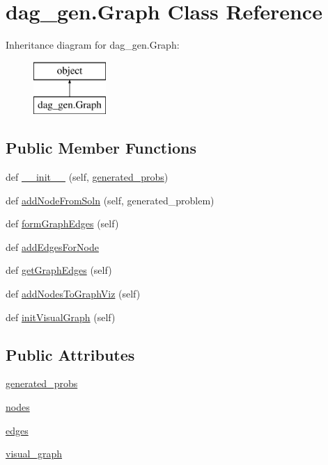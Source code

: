 \hypertarget{classdag__gen_1_1_graph}{}\section{dag\+\_\+gen.\+Graph Class Reference}
\label{classdag__gen_1_1_graph}
Inheritance diagram for dag\+\_\+gen.\+Graph\+:\begin{figure}[H]
\begin{center}
\leavevmode
\includegraphics[height=2.000000cm]{classdag__gen_1_1_graph}
\end{center}
\end{figure}
\subsection*{Public Member Functions}
\begin{DoxyCompactItemize}
\item 
def \hyperlink{classdag__gen_1_1_graph_a68c180ccb57ba7a29ac533fc854c6303}{\+\_\+\+\_\+init\+\_\+\+\_\+} (self, \hyperlink{classdag__gen_1_1_graph_a28d5cae8043efce22f89f11ca36eb303}{generated\+\_\+probs})
\item 
def \hyperlink{classdag__gen_1_1_graph_ad2181fcf4ffc0757162e4542d4f23985}{add\+Node\+From\+Soln} (self, generated\+\_\+problem)
\item 
def \hyperlink{classdag__gen_1_1_graph_a4caaaac0a7b964f20156bff60031a1ba}{form\+Graph\+Edges} (self)
\item 
def \hyperlink{classdag__gen_1_1_graph_a88c9c5f5c690f00d51e5d4799b0a8a1d}{add\+Edges\+For\+Node}
\item 
def \hyperlink{classdag__gen_1_1_graph_a07a3d79f47d449935d22518826adabf7}{get\+Graph\+Edges} (self)
\item 
def \hyperlink{classdag__gen_1_1_graph_a9dcff2a55150dc327da794786ed05ab7}{add\+Nodes\+To\+Graph\+Viz} (self)
\item 
def \hyperlink{classdag__gen_1_1_graph_a92bd4b78b6b9a8049adcac280e924681}{init\+Visual\+Graph} (self)
\end{DoxyCompactItemize}
\subsection*{Public Attributes}
\begin{DoxyCompactItemize}
\item 
\hyperlink{classdag__gen_1_1_graph_a28d5cae8043efce22f89f11ca36eb303}{generated\+\_\+probs}
\item 
\hyperlink{classdag__gen_1_1_graph_a69f6f8ae5e48955976f8ec77a5df2e63}{nodes}
\item 
\hyperlink{classdag__gen_1_1_graph_a9e07ebdf1c1ddec778c7e56a741408a4}{edges}
\item 
\hyperlink{classdag__gen_1_1_graph_a6fa5aa97b32670d1089b5743d702083b}{visual\+\_\+graph}
\end{DoxyCompactItemize}


